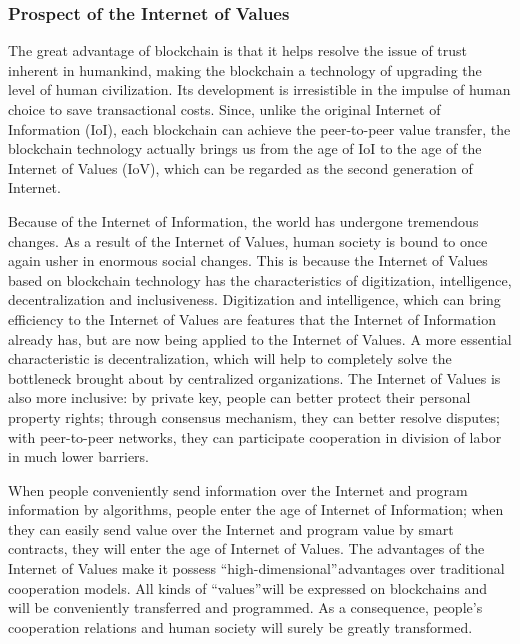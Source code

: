 \documentclass[a4paper,12pt]{article}
\begin{document}
\subsubsection{Prospect of the Internet of Values}

The great advantage of blockchain is that it helps resolve the issue of trust inherent in humankind, making the blockchain a technology of upgrading the level of human civilization. Its development is irresistible in the impulse of human choice to save transactional costs. Since, unlike the original Internet of Information (IoI), each blockchain can achieve the peer-to-peer value transfer, the blockchain technology actually brings us from the age of IoI to the age of the Internet of Values (IoV), which can be regarded as the second generation of Internet. 

Because of the Internet of Information, the world has undergone tremendous changes. As a result of the Internet of Values, human society is bound to once again usher in enormous social changes. This is because the Internet of Values based on blockchain technology has the characteristics of digitization, intelligence, decentralization and inclusiveness. Digitization and intelligence, which can bring efficiency to the Internet of Values are features that the Internet of Information already has, but are now being applied to the Internet of Values. A more essential characteristic is decentralization, which will help to completely solve the bottleneck brought about by centralized organizations. The Internet of Values is also more inclusive: by private key, people can better protect their personal property rights; through consensus mechanism, they can better resolve disputes; with peer-to-peer networks, they can participate cooperation in division of labor in much lower barriers.

When people conveniently send information over the Internet and program information by algorithms, people enter the age of Internet of Information; when they can easily send value over the Internet and program value by smart contracts, they will enter the age of Internet of Values. The advantages of the Internet of Values make it possess “high-dimensional” advantages over traditional cooperation models. All kinds of “values” will be expressed on blockchains and will be conveniently transferred and programmed. As a consequence, people's cooperation relations and human society will surely be greatly transformed.
\end{document}
